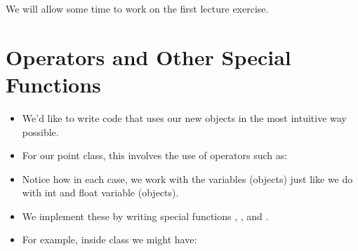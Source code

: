 \documentclass[letterpaper,10pt,english]{sphinxmanual}
\begin{document}
We will allow some time to work on the first lecture exercise.


\section{Operators and Other Special Functions}
\label{\detokenize{lecture_notes/lec18_classes1:operators-and-other-special-functions}}\begin{itemize}
\item {} 
We’d like to write code that uses our new objects in the most
intuitive way possible.

\item {} 
For our point class, this involves the use of operators such as:

\begin{sphinxVerbatim}[commandchars=\\\{\}]
   
   
    
    
  
\end{sphinxVerbatim}

\item {} 
Notice how in each case, we work with the  variables
(objects) just like we do with int and float variable (objects).

\item {} 
We implement these by writing special functions ,
, and .

\item {} 
For example, inside  class we might have:

\begin{sphinxVerbatim}[commandchars=\\\{\}]
  
           
\end{sphinxVerbatim}


\end{itemize}
\end{document}
